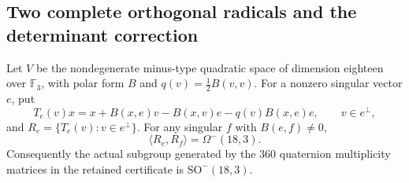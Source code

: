 \subsection{Two complete orthogonal radicals and the determinant correction}

\begin{lemma}
\label{lem:two-orthogonal-radicals}
Let \(V\) be the nondegenerate minus-type quadratic
space of dimension eighteen over \(\mathbb F_3\),
with polar form \(B\) and
\(q(v)=\tfrac12 B(v,v)\).
For a nonzero singular vector \(e\), put
\[
 T_e(v)x=x+B(x,e)v-B(x,v)e-q(v)B(x,e)e,
 \qquad v\in e^\perp,
 \tag{OG.1}
\]
and \(R_e=\{T_e(v):v\in e^\perp\}\).
For any singular \(f\) with \(B(e,f)\ne0\),
\[
                 \langle R_e,R_f\rangle=\Omega^-(18,3).
 \tag{OG.2}
\]
Consequently the actual subgroup generated by the
\(360\) quaternion multiplicity matrices in the
retained certificate is \(\mathrm{SO}^-(18,3)\).
\end{lemma}
